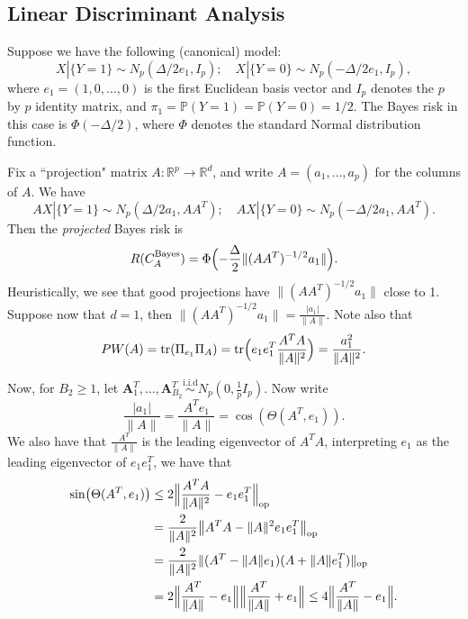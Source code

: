 \documentclass[12pt]{article}
\begin{document}
\subsection{Linear Discriminant Analysis}
Suppose we have the following (canonical) model:
\[
X | \{Y = 1\} \sim N_p(\Delta/2 e_1, I_p); \quad X | \{Y = 0\} \sim N_p(-\Delta/2 e_1, I_p),
\]
where $e_1 = (1, 0, \ldots, 0)$ is the first Euclidean basis vector and $I_p$ denotes the $p$ by $p$ identity matrix, and $\pi_1 = \mathbb{P}(Y=1) = \mathbb{P}(Y=0) = 1/2$. The Bayes risk in this case is $\Phi(-\Delta/2)$, where $\Phi$ denotes the standard Normal distribution function. 

Fix a ``projection" matrix $A: \mathbb{R}^p \rightarrow \mathbb{R}^d$, and write $A = (a_1, \ldots, a_p)$ for the columns of $A$. We have 
\[
AX | \{Y = 1\} \sim N_p(\Delta/2 a_1, AA^T); \quad AX | \{Y = 0\} \sim N_p(-\Delta/2 a_1, AA^T). 
\] 
Then the \emph{projected} Bayes risk is 
\[
R(C_{A}^{\mathrm{Bayes}}) = \Phi\Bigl(-\frac{\Delta}{2} \|(AA^T)^{-1/2} a_1 \| \Bigr).
\]
Heuristically, we see that good projections have $\|(AA^T)^{-1/2} a_1\|$ close to 1.  Suppose now that $d =1$, then $\|(AA^T)^{-1/2} a_1\| = \frac{|a_1|}{\|A\|}$. Note also that 
\[   
PW(A)   = \mathrm{tr}(\Pi_{e_1}\Pi_{A}) = \mathrm{tr}\Bigl(e_1e_1^T\frac{A^TA}{\|A\|^2}\Bigr)  =  \frac{a_1^2}{\|A\|^2}.
\]  

Now, for $B_2 \geq 1$, let $\mathbf{A}_1^T, \ldots, \mathbf{A}_{B_2}^T \stackrel{\mathrm{i.i.d}}{\sim} N_p(0, \frac{1}{p} I_p)$. Now write
\[
 \frac{|a_1|}{\|A\|} = \frac{A^T e_1 } {\|A\|} = \cos(\Theta(A^T, e_1)). 
\] 
We also have that $\frac{A^T}{\|A\|}$ is the leading eigenvector of $A^TA$, interpreting $e_1$ as the leading eigenvector of $e_1e_1^T$, we have that 
\begin{align*}
\sin\bigl(\Theta(A^T, e_1)\bigr) &\leq 2\Bigl\|\frac{A^TA}{\|A\|^2} -  e_1e_1^T\Bigr\|_{\mathrm{op} } 
\\ & = \frac{ 2}{\|A\|^2} \bigl\| A^TA - \|A\|^2 e_1e_1^T \bigr\|_{\mathrm{op}} 
\\ & = \frac{2}{\|A\|^2} \| (A^T - \|A\|e_1)(A + \|A\|e_1^T)\|_{\mathrm{op}} 
\\ & = 2\Bigl\|\frac{A^T}{\|A\|} - e_1\Bigr\|\Bigl\|\frac{A^T}{\|A\|} + e_1\Bigr\| \leq 4 \Bigl\|\frac{A^T}{\|A\|} - e_1\Bigr\|.  
\end{align*} 
\end{document}
